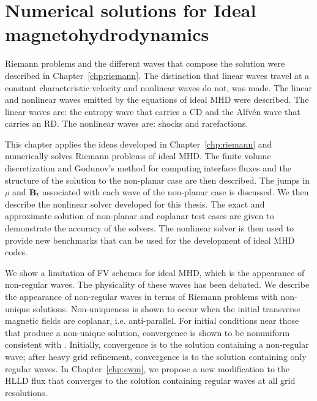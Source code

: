 %
%


\chapter[Numerical solutions for ideal magnetohydrodynamics]{Numerical solutions for Ideal magnetohydrodynamics}
\label{chp:num_mhd}

Riemann problems and the different waves that compose the solution were described in Chapter~\ref{chp:riemann}. The distinction that linear waves travel at a constant characteristic velocity and nonlinear waves do not, was made.  The linear and nonlinear waves emitted by the equations of ideal MHD were described.  The linear waves are: the entropy wave that carries a CD and the Alfv{\'e}n wave that carries an RD.  The nonlinear waves are: shocks and rarefactions.  

This chapter applies the ideas developed in Chapter~\ref{chp:riemann} and numerically solves Riemann problems of ideal MHD. The finite volume discretization and Godunov's method for computing interface fluxes and  the structure of the solution to the non-planar case are then described.  The jumps in $\rho$ and $\mathbf{B}_t$ associated with each wave of the non-planar case is discussed.  We then describe the nonlinear solver developed for this thesis.  The exact and approximate solution of non-planar and coplanar test cases are given to demonstrate the accuracy of the solvers.  The nonlinear solver is then used to provide new benchmarks that can be used for the development of ideal MHD codes.  

We show a limitation of FV schemes for ideal MHD, which is the appearance of non-regular waves.  The physicality of these waves has been debated.  We describe the appearance of non-regular waves in terms of Riemann problems with non-unique solutions.  Non-uniqueness is shown to occur when the initial transverse magnetic fields are coplanar, i.e. anti-parallel.  For initial conditions near those that produce a non-unique solution, convergence is shown to be nonuniform consistent with \citep{Torrilhon:2003b}.  Initially, convergence is to the solution containing a non-regular wave; after heavy grid refinement, convergence is to the solution containing only regular waves.  In Chapter~\ref{chp:cwm}, we propose a new modification to the HLLD flux that converges to the solution containing regular waves at all grid resolutions.   

